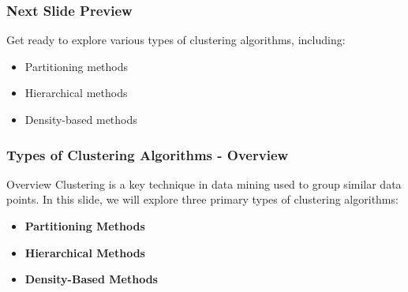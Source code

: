 \documentclass[aspectratio=169]{beamer}
\begin{document}
\begin{frame}[fragile]
    \frametitle{Next Slide Preview}
    
    Get ready to explore various types of clustering algorithms, including:
    \begin{itemize}
        \item Partitioning methods
        \item Hierarchical methods
        \item Density-based methods
    \end{itemize}
\end{frame}

\begin{frame}[fragile]
    \frametitle{Types of Clustering Algorithms - Overview}
    \begin{block}{Overview}
        Clustering is a key technique in data mining used to group similar data points. 
        In this slide, we will explore three primary types of clustering algorithms:
        \begin{itemize}
            \item \textbf{Partitioning Methods}
            \item \textbf{Hierarchical Methods}
            \item \textbf{Density-Based Methods}
        \end{itemize}
    \end{block}
\end{frame}
\end{document}

